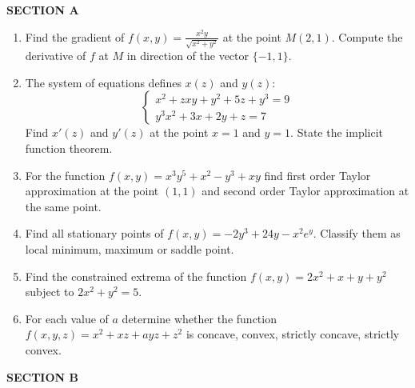 \documentclass[A4,12pt]{article}
\begin{document}
\textbf{SECTION A}

\begin{enumerate}
	\item Find the gradient of $f(x,y) =\frac{x^2y}{\sqrt{x^2+y^2}}$
at the point $M(2,1)$. Compute the derivative of $f$ at $M$ in direction of the vector $\{-1, 1\}$.
	\item The system of equations defines $x(z)$ and $y(z)$:
\begin{equation}
\begin{cases}
x^2+zxy+y^2+5z+y^3=9 \\
y^3x^2+3x+2y+z=7 \nonumber
\end{cases}
\end{equation}
Find $x'(z)$ and $y'(z)$ at the point $x=1$ and $y=1$. State the implicit function theorem.
 \item For the function $f(x,y)=x^3y^5+x^2-y^3+xy$ find first order Taylor approximation at the point $(1,1)$ and second order Taylor approximation at the same point.
	\item Find all stationary points of $f(x,y) = -2y^3+24y-x^2e^y$. Classify them as local minimum, maximum or saddle point.
	\item Find the constrained extrema of the function $f(x,y)=2x^2+x+y+y^2$ subject to $2x^2+y^2=5$.
	\item  For each value of $a$ determine whether the function $f(x,y,z)=x^2+xz+ayz+z^2$ is concave, convex, strictly concave, strictly convex.
\end{enumerate}

\textbf{SECTION B}
\end{document}
